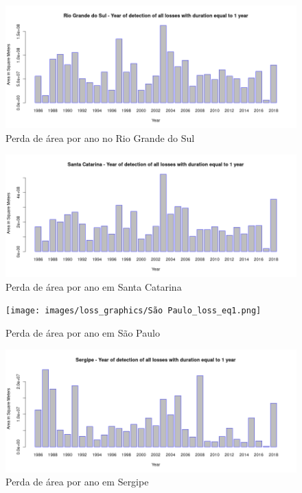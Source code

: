 \begin{figure}[H]
    \centering
    \includegraphics[scale=.5]{images/loss_graphics/Rio Grande do Sul_loss_eq1.png}
    \caption{Perda de área por ano no Rio Grande do Sul}
    \label{fig:loss_rio_grande_do_sul}
\end{figure}

\begin{figure}[H]
    \centering
    \includegraphics[scale=.5]{images/loss_graphics/Santa Catarina_loss_eq1.png}
    \caption{Perda de área por ano em Santa Catarina}
    \label{fig:loss_santa_catarina}
\end{figure}

\begin{figure}[H]
    \centering
    \texttt{[image: images/loss\_graphics/São Paulo\_loss\_eq1.png]}
    \caption{Perda de área por ano em São Paulo}
    \label{fig:loss_sao_paulo}
\end{figure}

\begin{figure}[H]
    \centering
    \includegraphics[scale=.5]{images/loss_graphics/Sergipe_loss_eq1.png}
    \caption{Perda de área por ano em Sergipe}
    \label{fig:loss_sergipe}
\end{figure}

